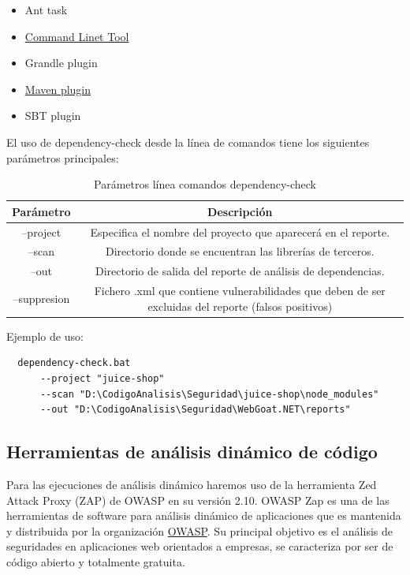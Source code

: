 \begin{itemize}
    \item Ant task
    \item \href{https://github.com/jeremylong/DependencyCheck/releases/download/v6.1.6/dependency-check-6.1.6-release.zip}{Command Linet Tool}
    \item Grandle plugin
    \item \href{https://search.maven.org/#artifactdetails%7Corg.owasp%7Cdependency-check-maven%7C6.1.6%7Cmaven-plugin}{Maven plugin}
    \item SBT plugin
\end{itemize}

El uso de dependency-check desde la línea de comandos tiene los siguientes parámetros principales:\\

\begin{table}[h!]
  \begin{center}
  \caption{Parámetros línea comandos dependency-check}
  \label{tab:tabla 1}
  \begin{tabular}{c|c}
    \textbf{Parámetro} & \textbf{Descripción}\\
    \hline
      --project & Especifica el nombre del proyecto que aparecerá en el reporte.\\ 
      --scan & Directorio donde se encuentran las librerías de terceros.\\
      --out &  Directorio de salida del reporte de análisis de dependencias.\\
      --suppresion & Fichero .xml que contiene vulnerabilidades que deben de ser excluidas del reporte 
      (falsos positivos)      
  \end{tabular}
\end{center}
\end{table}

Ejemplo de uso:\\
\begin{verbatim}
  dependency-check.bat 
      --project "juice-shop" 
      --scan "D:\CodigoAnalisis\Seguridad\juice-shop\node_modules" 
      --out "D:\CodigoAnalisis\Seguridad\WebGoat.NET\reports" 
\end{verbatim}
\newpage
\subsection{Herramientas de análisis dinámico de código}
Para las ejecuciones de análisis dinámico haremos uso de la herramienta Zed Attack Proxy (ZAP) de OWASP en su versión 2.10. OWASP Zap es una de las herramientas de 
software para análisis dinámico de aplicaciones que es mantenida y distribuida por la organización \href{https://owasp.org/www-project-zap/}{OWASP}. Su principal objetivo es el 
análisis de seguridades en aplicaciones web orientados a empresas, se caracteriza por ser de código abierto y totalmente gratuita.\\

